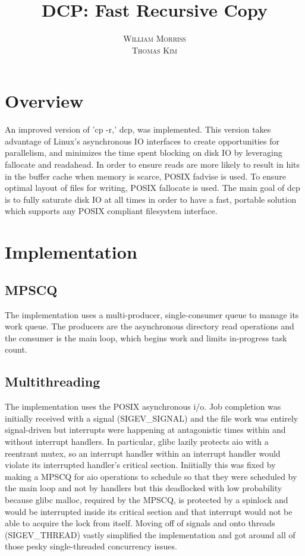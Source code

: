 \documentclass[12pt]{article}
\title{\vspace{-25mm}\fontsize{16pt}{10pt}\selectfont\textbf{DCP: Fast Recursive Copy}} %
\author{
  \textsc{William Morriss} \\
  \textsc{Thomas Kim}
}
\date{}
\begin{document}
\maketitle %

\section{Overview}
An improved version of 'cp -r,' dcp, was implemented.
This version takes advantage of Linux's asynchronous IO interfaces to create
opportunities for parallelism, and minimizes the time spent blocking on disk
IO by leveraging fallocate and readahead. In order to ensure reads
are more likely to result in hits in the buffer cache when memory is scarce, POSIX
fadvise is used. To ensure optimal layout of files for writing, POSIX
fallocate is used. The main goal of dcp is to fully saturate disk IO
at all times in order to have a fast, portable solution which supports
any POSIX compliant filesystem interface.

\section{Implementation}

\subsection{MPSCQ}
The implementation uses a multi-producer, single-consumer queue to manage its
work queue. The producers are the asynchronous directory read operations and
the consumer is the main loop, which begins work and limits in-progress task
count.

\subsection{Multithreading}
The implementation uses the POSIX asynchronous i/o. Job completion was initially
received with a signal (SIGEV\_SIGNAL) and the file work was entirely signal-driven
but interrupts were happening at antagonistic times within and without interrupt
handlers. In particular, glibc lazily protects aio with a reentrant mutex, so an
interrupt handler within an interrupt handler would violate its interrupted handler's
critical section. Iniitially this was fixed by making a MPSCQ for aio operations to schedule
so that they were scheduled by the main loop and not by handlers but this deadlocked with low
probability because glibc malloc, required by the MPSCQ, is protected by a spinlock and
would be interrupted inside its critical section and that interrupt would not be
able to acquire the lock from itself. Moving off of signals and onto threads (SIGEV\_THREAD)
vastly simplified the implementation and got around all of those pesky single-threaded
concurrency issues.
\end{document}

